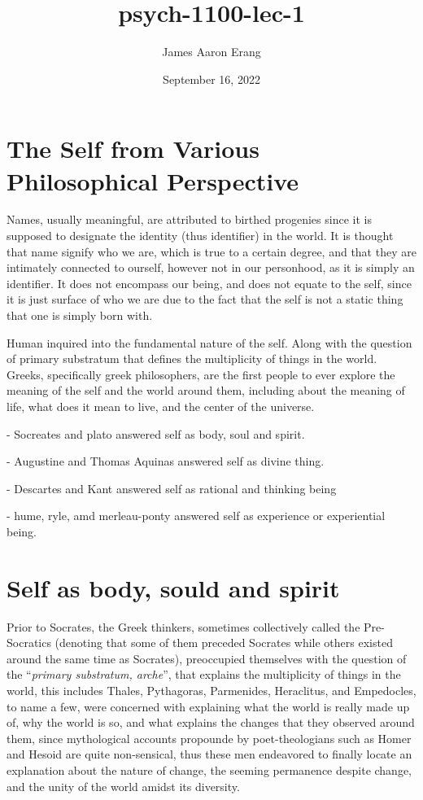 \documentclass[12pt, UTF8]{article}
\title{psych-1100-lec-1}
\author{James Aaron Erang}
\date{September 16, 2022}
\begin{document}
	\maketitle
	
	\section*{The Self from Various Philosophical Perspective}
	
	Names, usually meaningful, are attributed to birthed progenies since it is supposed to designate the identity (thus identifier) in the world. It is thought that name signify who we are, which is true to a certain degree, and that they are intimately connected to ourself, however not in our personhood, as it is simply an identifier. It does not encompass our being, and does not equate to the self, since it is just surface of who we are due to the fact that the self is not a static thing that one is simply born with.
	
	Human inquired into the fundamental nature of the self. Along with the question of primary substratum that defines the multiplicity of things in the world. Greeks, specifically greek philosophers, are the first people to ever explore the meaning of the self and the world around them, including about the meaning of life, what does it mean to live, and the center of the universe.
	
	- Socreates and plato answered self as body, soul and spirit.
	
	- Augustine and Thomas Aquinas answered self as divine thing.
	
	- Descartes and Kant answered self as rational and thinking being
	
	- hume, ryle, amd merleau-ponty answered self as experience or experiential being.
	
	\section{Self as body, sould and spirit}
	
	Prior to Socrates, the Greek thinkers, sometimes collectively called the Pre-Socratics (denoting that some of them preceded Socrates while others existed around the same time as Socrates), preoccupied themselves with the question of the ``\textit{primary substratum, arche}'', that explains the multiplicity of things in the world, this includes Thales, Pythagoras, Parmenides, Heraclitus, and Empedocles, to name a few, were concerned with explaining what the world is really made up of, why the world is so, and what explains the changes that they observed around them, since mythological accounts propounde by poet-theologians such as Homer and Hesoid are quite non-sensical, thus these men endeavored to finally locate an explanation about the nature of change, the seeming permanence despite change, and the unity of the world amidst its diversity.
	
\end{document}
